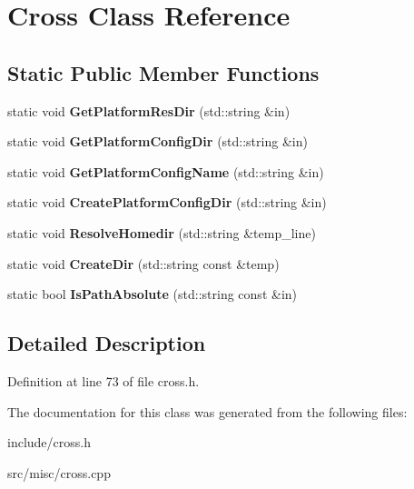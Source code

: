\hypertarget{classCross}{\section{Cross Class Reference}
\label{classCross}
}
\subsection*{Static Public Member Functions}
\begin{DoxyCompactItemize}
\item 
\hypertarget{classCross_a73843b748a4bb6c2d4167407cd893676}{static void {\bfseries Get\-Platform\-Res\-Dir} (std\-::string \&in)}\label{classCross_a73843b748a4bb6c2d4167407cd893676}

\item 
\hypertarget{classCross_ae970b76d2aaead7f55e7b1a05574a880}{static void {\bfseries Get\-Platform\-Config\-Dir} (std\-::string \&in)}\label{classCross_ae970b76d2aaead7f55e7b1a05574a880}

\item 
\hypertarget{classCross_a76229c50352b8f4f44dbcd68a7fb4f7d}{static void {\bfseries Get\-Platform\-Config\-Name} (std\-::string \&in)}\label{classCross_a76229c50352b8f4f44dbcd68a7fb4f7d}

\item 
\hypertarget{classCross_ac95e21d0ca9ec1e467b680e9bdbbfc33}{static void {\bfseries Create\-Platform\-Config\-Dir} (std\-::string \&in)}\label{classCross_ac95e21d0ca9ec1e467b680e9bdbbfc33}

\item 
\hypertarget{classCross_ac79890893bb87e04d37f8d2935cc80a8}{static void {\bfseries Resolve\-Homedir} (std\-::string \&temp\-\_\-line)}\label{classCross_ac79890893bb87e04d37f8d2935cc80a8}

\item 
\hypertarget{classCross_a9674b6158cf06a616ba6f899f72693b2}{static void {\bfseries Create\-Dir} (std\-::string const \&temp)}\label{classCross_a9674b6158cf06a616ba6f899f72693b2}

\item 
\hypertarget{classCross_aed9b05e77ca4087abed9cfd0460c7408}{static bool {\bfseries Is\-Path\-Absolute} (std\-::string const \&in)}\label{classCross_aed9b05e77ca4087abed9cfd0460c7408}

\end{DoxyCompactItemize}


\subsection{Detailed Description}


Definition at line 73 of file cross.\-h.



The documentation for this class was generated from the following files\-:\begin{DoxyCompactItemize}
\item 
include/cross.\-h\item 
src/misc/cross.\-cpp\end{DoxyCompactItemize}
